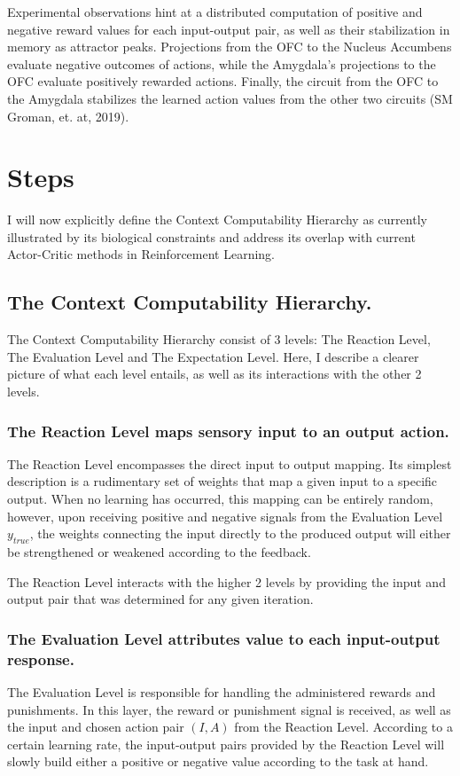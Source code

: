 \documentclass[]{article}
\begin{document}
Experimental observations hint at a distributed computation of positive and negative reward values for each input-output pair, as well as their stabilization in memory as attractor peaks.  Projections from the OFC to the Nucleus Accumbens evaluate negative outcomes of actions, while the Amygdala's projections to the OFC evaluate positively rewarded actions.  Finally, the circuit from the OFC to the Amygdala stabilizes the learned action values from the other two circuits (SM Groman, et. at, 2019).


\section{Steps}
I will now explicitly define the Context Computability Hierarchy as currently illustrated by its biological constraints and address its overlap with current Actor-Critic methods in Reinforcement Learning.

\subsection{The Context Computability Hierarchy.}
The Context Computability Hierarchy consist of 3 levels: The Reaction Level, The Evaluation Level and The Expectation Level.  Here, I describe a clearer picture of what each level entails, as well as its interactions with the other 2 levels.

\subsubsection{The Reaction Level maps sensory input to an output action.}
The Reaction Level encompasses the direct input to output mapping.  Its simplest description is a rudimentary set of weights that map a given input to a specific output.  When no learning has occurred, this mapping can be entirely random, however, upon receiving positive and negative signals from the Evaluation Level $y_{true}$, the weights connecting the input directly to the produced output will either be strengthened or weakened according to the feedback.

The Reaction Level interacts with the higher 2 levels by providing the input and output pair that was determined for any given iteration.

\subsubsection{The Evaluation Level attributes value to each input-output response.}
The Evaluation Level is responsible for handling the administered rewards and punishments.  In this layer, the reward or punishment signal is received, as well as the input and chosen action pair $(I, A)$ from the Reaction Level.  According to a certain learning rate, the input-output pairs provided by the Reaction Level will slowly build either a positive or negative value according to the task at hand.
\end{document}
